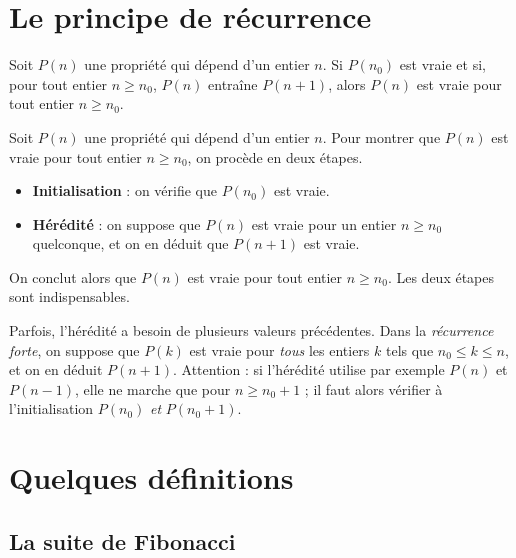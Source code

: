 \documentclass[11pt]{article}
\begin{document}

\section{Le principe de récurrence}\label{sec:principe}

\begin{theoreme}\label{thm:recurrence}
Soit \(P(n)\) une propriété qui dépend d'un entier \(n\). Si \(P(n_0)\) est vraie et si, pour tout entier \(n \geq n_0\), \(P(n)\) entraîne \(P(n+1)\), alors \(P(n)\) est vraie pour tout entier \(n \geq n_0\).
\end{theoreme}

\begin{methode}
Soit \(P(n)\) une propriété qui dépend d'un entier \(n\). Pour montrer que \(P(n)\) est vraie pour tout entier \(n \geq n_0\), on procède en deux étapes.
\begin{itemize}
    \item \textbf{Initialisation} : on vérifie que \(P(n_0)\) est vraie.
    \item \textbf{Hérédité} : on suppose que \(P(n)\) est vraie pour un entier \(n \geq n_0\) quelconque, et on en déduit que \(P(n+1)\) est vraie.
\end{itemize}
On conclut alors que \(P(n)\) est vraie pour tout entier \(n \geq n_0\). Les deux étapes sont indispensables.
\end{methode}

Parfois, l'hérédité a besoin de plusieurs valeurs précédentes. Dans la \emph{récurrence forte}, on suppose que \(P(k)\) est vraie pour \emph{tous} les entiers \(k\) tels que \(n_0 \leq k \leq n\), et on en déduit \(P(n+1)\). Attention : si l'hérédité utilise par exemple \(P(n)\) et \(P(n-1)\), elle ne marche que pour \(n \geq n_0 + 1\) ; il faut alors vérifier à l'initialisation \(P(n_0)\) \emph{et} \(P(n_0+1)\).

\section{Quelques définitions}\label{sec:definitions}

\subsection{La suite de Fibonacci}\label{sec:fibonacci}
\end{document}
